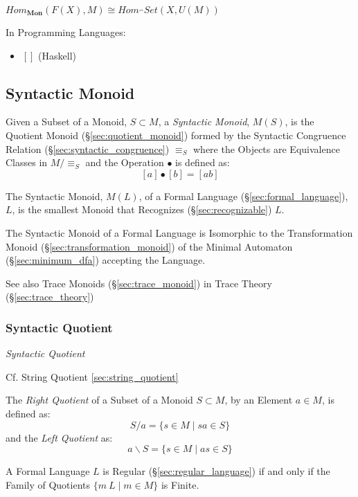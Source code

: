 $Hom_\mathbf{Mon}(F(X), M) \cong Hom_\cat{Set}(X, U(M))$

In Programming Languages:

\begin{itemize}
  \item $\mathtt{[]}$ (Haskell)
\end{itemize}



\subsection{Syntactic Monoid}\label{sec:syntactic_monoid}

Given a Subset of a Monoid, $S \subset M$, a \emph{Syntactic Monoid},
$M(S)$, is the Quotient Monoid (\S\ref{sec:quotient_monoid}) formed by
the Syntactic Congruence Relation (\S\ref{sec:syntactic_congruence})
$\equiv_S$ where the Objects are Equivalence Classes in $M / \equiv_S$
and the Operation $\bullet$ is defined as:
\[
  [a] \bullet [b] = [ab]
\]

The Syntactic Monoid, $M(L)$, of a Formal Language
(\S\ref{sec:formal_language}), $L$, is the smallest Monoid that
Recognizes (\S\ref{sec:recognizable}) $L$.

The Syntactic Monoid of a Formal Language is Isomorphic to the
Transformation Monoid (\S\ref{sec:transformation_monoid}) of the
Minimal Automaton (\S\ref{sec:minimum_dfa}) accepting the Language.

\fist See also Trace Monoids (\S\ref{sec:trace_monoid}) in Trace
Theory (\S\ref{sec:trace_theory})



\subsubsection{Syntactic Quotient}\label{sec:syntactic_quotient}

\emph{Syntactic Quotient}

\fist Cf. String Quotient \ref{sec:string_quotient}

The \emph{Right Quotient} of a Subset of a Monoid $S \subset M$, by an
Element $a \in M$, is defined as:
\[
  S / a = \{ s \in M\;|\;sa \in S \}
\]
and the \emph{Left Quotient} as:
\[
  a \backslash S = \{ s \in M\;|\;as \in S \}
\]

A Formal Language $L$ is Regular (\S\ref{sec:regular_language}) if and
only if the Family of Quotients $\{ m \ L \;|\; m \in M \}$ is Finite.




